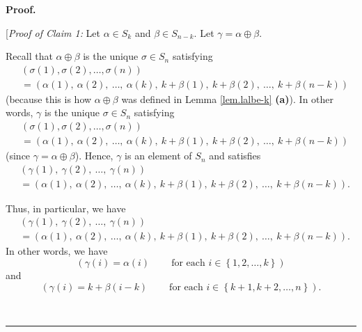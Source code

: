 \documentclass
[numbers=enddot,12pt,final,onecolumn,notitlepage,english]{scrartcl}%
\theoremstyle{definition}
\newenvironment{statement}{\begin{quote}}{\end{quote}}
\newenvironment{proof}[1][Proof]{\noindent\textbf{#1.} }{\ \rule{0.5em}{0.5em}}
\newenvironment{verlong}{}{}
\begin{document}
\begin{verlong}
\begin{proof}
\begin{statement}
\end{statement}

[\textit{Proof of Claim 1:} Let $\alpha\in S_{k}$ and $\beta\in S_{n-k}$. Let
$\gamma=\alpha\oplus\beta$.

Recall that $\alpha\oplus\beta$ is the unique $\sigma\in S_{n}$ satisfying%
\begin{align*}
&  \left(  \sigma\left(  1\right)  ,\sigma\left(  2\right)  ,\ldots
,\sigma\left(  n\right)  \right) \\
&  =\left(  \alpha\left(  1\right)  ,\ \alpha\left(  2\right)  ,\ \ldots
,\ \alpha\left(  k\right)  ,\ k+\beta\left(  1\right)  ,\ k+\beta\left(
2\right)  ,\ \ldots,\ k+\beta\left(  n-k\right)  \right)
\end{align*}
(because this is how $\alpha\oplus\beta$ was defined in Lemma
\ref{lem.lalbe-k} \textbf{(a)}). In other words, $\gamma$ is the unique
$\sigma\in S_{n}$ satisfying%
\begin{align*}
&  \left(  \sigma\left(  1\right)  ,\sigma\left(  2\right)  ,\ldots
,\sigma\left(  n\right)  \right) \\
&  =\left(  \alpha\left(  1\right)  ,\ \alpha\left(  2\right)  ,\ \ldots
,\ \alpha\left(  k\right)  ,\ k+\beta\left(  1\right)  ,\ k+\beta\left(
2\right)  ,\ \ldots,\ k+\beta\left(  n-k\right)  \right)
\end{align*}
(since $\gamma=\alpha\oplus\beta$). Hence, $\gamma$ is an element of $S_{n}$
and satisfies
\begin{align*}
&  \left(  \gamma\left(  1\right)  ,\ \gamma\left(  2\right)  ,\ \ldots
,\ \gamma\left(  n\right)  \right) \\
&  =\left(  \alpha\left(  1\right)  ,\ \alpha\left(  2\right)  ,\ \ldots
,\ \alpha\left(  k\right)  ,\ k+\beta\left(  1\right)  ,\ k+\beta\left(
2\right)  ,\ \ldots,\ k+\beta\left(  n-k\right)  \right)  .
\end{align*}


Thus, in particular, we have%
\begin{align*}
&  \left(  \gamma\left(  1\right)  ,\ \gamma\left(  2\right)  ,\ \ldots
,\ \gamma\left(  n\right)  \right) \\
&  =\left(  \alpha\left(  1\right)  ,\ \alpha\left(  2\right)  ,\ \ldots
,\ \alpha\left(  k\right)  ,\ k+\beta\left(  1\right)  ,\ k+\beta\left(
2\right)  ,\ \ldots,\ k+\beta\left(  n-k\right)  \right)  .
\end{align*}
In other words, we have%
\begin{equation}
\left(  \gamma\left(  i\right)  =\alpha\left(  i\right)
\ \ \ \ \ \ \ \ \ \ \text{for each }i\in\left\{  1,2,\ldots,k\right\}
\right)  \label{pf.lem.block-tria-rowdet.prod=prodprod.pf.1}%
\end{equation}
and%
\begin{equation}
\left(  \gamma\left(  i\right)  =k+\beta\left(  i-k\right)
\ \ \ \ \ \ \ \ \ \ \text{for each }i\in\left\{  k+1,k+2,\ldots,n\right\}
\right)  . \label{pf.lem.block-tria-rowdet.prod=prodprod.pf.2}%
\end{equation}



\end{proof}
\end{verlong}
\end{document}
